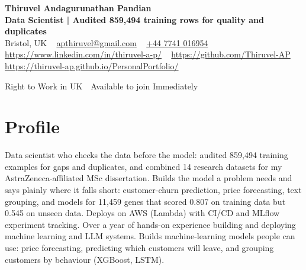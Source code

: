 \documentclass[a4paper,11pt]{article}
\newcommand{\num}[1]{\textbf{#1}}   %
\begin{document}
\begin{center}
  {\LARGE\bfseries Thiruvel Andagurunathan Pandian} \\[3pt]
  {\color{headernavy}\small\textbf{Data Scientist | Audited \num{859,494} training rows for quality and duplicates}} \\[3pt]
  {\small
  Bristol, UK\nobreak\ \,\textbar\, \href{mailto:apthiruvel@gmail.com}{apthiruvel@gmail.com}\nobreak\ \,\textbar\, \href{tel:+447741016954}{+44 7741 016954}\nobreak\ \,\textbar\, \href{https://www.linkedin.com/in/thiruvel-a-p/}{https://www.linkedin.com/in/thiruvel-a-p/}\nobreak\ \,\textbar\, \href{https://github.com/Thiruvel-AP}{https://github.com/Thiruvel-AP}\nobreak\ \,\textbar\, \href{https://thiruvel-ap.github.io/PersonalPortfolio/}{https://thiruvel-ap.github.io/PersonalPortfolio/}}\par\vspace{4pt}
  \noindent{} Right to Work in UK \,\textbar\, Available to join Immediately
\end{center}

\section{Profile}
Data scientist who checks the data before the model: audited 859,494 training examples for gaps and duplicates, and combined 14 research datasets for my AstraZeneca-affiliated MSc dissertation. Builds the model a problem needs and says plainly where it falls short: customer-churn prediction, price forecasting, text grouping, and models for 11,459 genes that scored 0.807 on training data but 0.545 on unseen data. Deploys on AWS (Lambda) with CI/CD and MLflow experiment tracking. Over a year of hands-on experience building and deploying machine learning and LLM systems. Builds machine-learning models people can use: price forecasting, predicting which customers will leave, and grouping customers by behaviour (XGBoost, LSTM).
\end{document}
